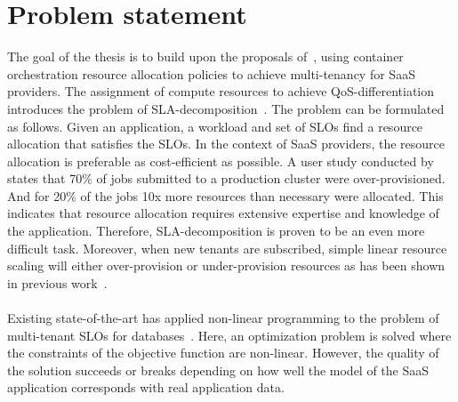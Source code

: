\section{Problem statement}
The goal of the thesis is to build upon the proposals of~\cite{TruyenEddy2016Taca}, using container orchestration resource allocation policies to achieve multi-tenancy for SaaS providers. The assignment of compute resources to achieve QoS-differentiation introduces the problem of SLA-decomposition~\cite{chen2007sla}. The problem can be formulated as follows. Given an application, a workload and set of SLOs find a resource allocation that satisfies the SLOs. In the context of SaaS providers, the resource allocation is preferable as cost-efficient as possible. A user study conducted by~\cite{jyothi2016morpheus} states that 70\%  of jobs submitted to a production cluster were over-provisioned. And for 20\% of the jobs 10x more resources than necessary were allocated. This indicates that resource allocation requires extensive expertise and knowledge of the application. Therefore, SLA-decomposition is proven to be an even more difficult task. Moreover, when new tenants are subscribed, simple linear resource scaling will either over-provision or under-provision resources as has been shown in previous work~\cite{andrejacobs,lang2014towards}.\\\\
Existing state-of-the-art has applied non-linear programming to the problem of multi-tenant SLOs for databases~\cite{lang2014towards}. Here, an optimization problem is solved where the constraints of the objective function are non-linear.  However, the quality of the solution succeeds or breaks depending on how well the model of the SaaS application corresponds with  real application data. 


